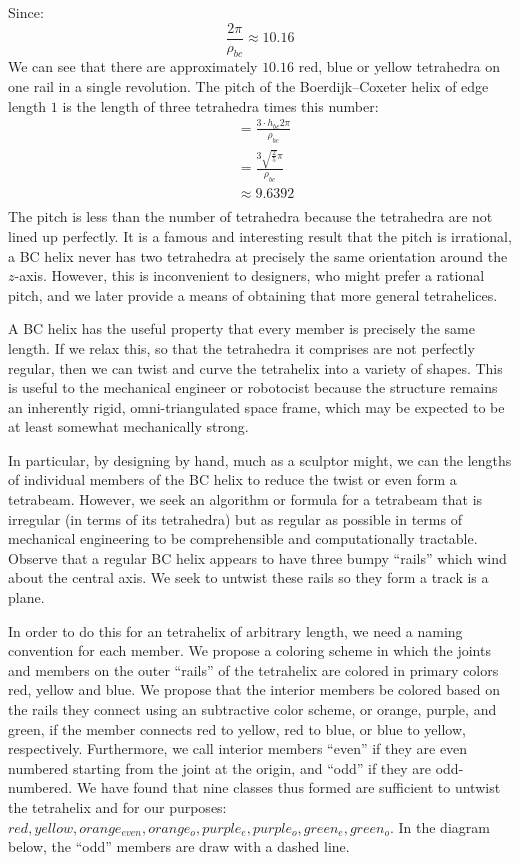 \documentclass[11pt]{article}
\begin{document}
Since:
\[ \frac{2 \pi}{\rho_{bc}} \approx 10.16
\]
We can see that there are approximately $10.16$ red, blue or yellow tetrahedra on one rail in a single revolution.
The pitch of the Boerdijk--Coxeter helix of edge length $1$ is the length of three tetrahedra times this number:
\begin{align*}
  &= \frac{3 \cdot h_{bc} 2 \pi }{\rho_{bc}} \\
  &= \frac{3  \sqrt{\frac{2}{5}}  \pi}{\rho_{bc}} \\
  &\approx 9.6392 \\
\end{align*}
The pitch is less than the number of tetrahedra because the tetrahedra are not lined up perfectly.
It is a famous and interesting result that the pitch is irrational, a BC helix never has two tetrahedra
at precisely the same orientation around the $z$-axis. However, this is inconvenient to designers, who
might prefer a rational pitch, and we later provide a means of obtaining that more general tetrahelices.

A BC helix has the useful property that every member is precisely the same length. If we relax this, so that the tetrahedra it
comprises are not perfectly regular, then we can twist and curve the tetrahelix into a variety of shapes. This is useful to
the mechanical engineer or robotocist because the structure remains an inherently rigid, omni-triangulated space frame, which
may be expected to be at least somewhat mechanically strong.

In particular, by designing by hand, much as a sculptor might, we can the lengths of individual members of the BC helix to reduce the
twist or even form a tetrabeam.
However, we seek an algorithm or formula for a tetrabeam that is irregular
(in terms of its tetrahedra) but as regular as possible in terms of mechanical engineering to be comprehensible and computationally tractable.
Observe that a regular BC helix appears to have three bumpy ``rails'' which wind about the central axis.  We seek to untwist
these rails so they form a track is a plane.

In order to do this for an tetrahelix of arbitrary length, we need a naming convention for each member. We propose a coloring
scheme in which the joints and members on the outer ``rails'' of the tetrahelix are colored in primary colors red, yellow and blue.
We propose that the interior members be colored based on the rails they connect using an subtractive color scheme, or orange, purple, and green,
if the member connects red to yellow, red to blue, or blue to yellow, respectively.  Furthermore, we call interior members ``even'' if they
are even numbered starting from the joint at the origin, and ``odd'' if they are odd-numbered.  We have found that nine classes thus
formed are sufficient to untwist the tetrahelix and for our purposes: $red, yellow, orange_{even}, orange_o, purple_e, purple_o, green_e, green_o$.
In the diagram below, the ``odd'' members are draw with a dashed line.
\end{document}
